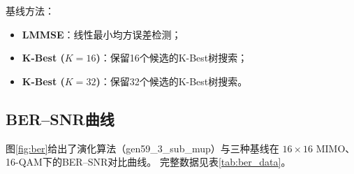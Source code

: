\documentclass[12pt, a4paper]{ctexart}
\begin{document}
基线方法：
\begin{itemize}[leftmargin=2em]
  \item \textbf{LMMSE}：线性最小均方误差检测；
  \item \textbf{K-Best ($K=16$)}：保留16个候选的K-Best树搜索；
  \item \textbf{K-Best ($K=32$)}：保留32个候选的K-Best树搜索。
\end{itemize}

\subsection{BER--SNR曲线}

图\ref{fig:ber}给出了演化算法（gen59\_3\_sub\_mup）与三种基线在
$16\times16$ MIMO、16-QAM下的BER--SNR对比曲线。
完整数据见表\ref{tab:ber_data}。
\end{document}
